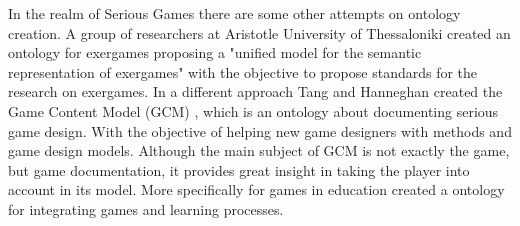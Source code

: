 In the realm of Serious Games there are some other attempts on ontology creation. A group of researchers at Aristotle University of Thessaloniki created an ontology for exergames proposing a "unified model for the semantic representation of exergames" \citep{bamparopoulos_towards_2016} with the objective to propose standards for the research on exergames. In a different approach Tang and Hanneghan created the Game Content Model (GCM) \citep{tang_game_2011}, which is an ontology about documenting serious game design. With the objective of helping new game designers with methods and game design models. Although the main subject of GCM is not exactly the game, but game documentation, it provides great insight in taking the player into account in its model. More specifically for games in education \cite{ghannem2011defining} created a ontology for integrating games and learning processes.